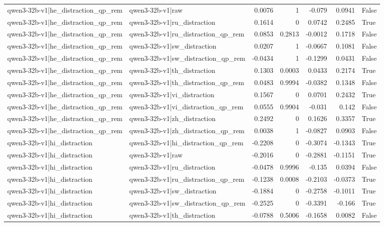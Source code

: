 \begin{table}
\begin{tabular}{l l r r r r l}
qwen3-32b-v1|he_distraction_qp_rem & qwen3-32b-v1|raw & 0.0076 & 1 & -0.079 & 0.0941 & False \\
qwen3-32b-v1|he_distraction_qp_rem & qwen3-32b-v1|ru_distraction & 0.1614 & 0 & 0.0742 & 0.2485 & True \\
qwen3-32b-v1|he_distraction_qp_rem & qwen3-32b-v1|ru_distraction_qp_rem & 0.0853 & 0.2813 & -0.0012 & 0.1718 & False \\
qwen3-32b-v1|he_distraction_qp_rem & qwen3-32b-v1|sw_distraction & 0.0207 & 1 & -0.0667 & 0.1081 & False \\
qwen3-32b-v1|he_distraction_qp_rem & qwen3-32b-v1|sw_distraction_qp_rem & -0.0434 & 1 & -0.1299 & 0.0431 & False \\
qwen3-32b-v1|he_distraction_qp_rem & qwen3-32b-v1|th_distraction & 0.1303 & 0.0003 & 0.0433 & 0.2174 & True \\
qwen3-32b-v1|he_distraction_qp_rem & qwen3-32b-v1|th_distraction_qp_rem & 0.0483 & 0.9994 & -0.0382 & 0.1348 & False \\
qwen3-32b-v1|he_distraction_qp_rem & qwen3-32b-v1|vi_distraction & 0.1567 & 0 & 0.0701 & 0.2432 & True \\
qwen3-32b-v1|he_distraction_qp_rem & qwen3-32b-v1|vi_distraction_qp_rem & 0.0555 & 0.9904 & -0.031 & 0.142 & False \\
qwen3-32b-v1|he_distraction_qp_rem & qwen3-32b-v1|zh_distraction & 0.2492 & 0 & 0.1626 & 0.3357 & True \\
qwen3-32b-v1|he_distraction_qp_rem & qwen3-32b-v1|zh_distraction_qp_rem & 0.0038 & 1 & -0.0827 & 0.0903 & False \\
qwen3-32b-v1|hi_distraction & qwen3-32b-v1|hi_distraction_qp_rem & -0.2208 & 0 & -0.3074 & -0.1343 & True \\
qwen3-32b-v1|hi_distraction & qwen3-32b-v1|raw & -0.2016 & 0 & -0.2881 & -0.1151 & True \\
qwen3-32b-v1|hi_distraction & qwen3-32b-v1|ru_distraction & -0.0478 & 0.9996 & -0.135 & 0.0394 & False \\
qwen3-32b-v1|hi_distraction & qwen3-32b-v1|ru_distraction_qp_rem & -0.1238 & 0.0008 & -0.2103 & -0.0373 & True \\
qwen3-32b-v1|hi_distraction & qwen3-32b-v1|sw_distraction & -0.1884 & 0 & -0.2758 & -0.1011 & True \\
qwen3-32b-v1|hi_distraction & qwen3-32b-v1|sw_distraction_qp_rem & -0.2525 & 0 & -0.3391 & -0.166 & True \\
qwen3-32b-v1|hi_distraction & qwen3-32b-v1|th_distraction & -0.0788 & 0.5006 & -0.1658 & 0.0082 & False \\

\end{tabular}
\end{table}
